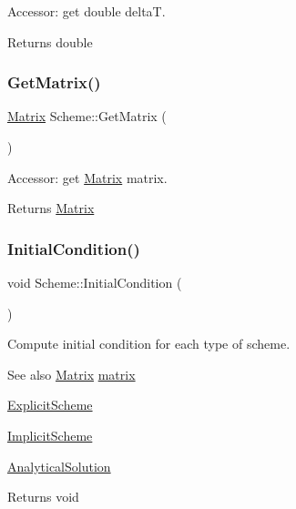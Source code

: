 Accessor\+: get double deltaT. \begin{DoxyReturn}{Returns}
double 
\end{DoxyReturn}
\mbox{\label{class_scheme_a14c333d182a6b4e94aa2a346000257ea}} 
\subsubsection{\texorpdfstring{Get\+Matrix()}{GetMatrix()}}
{\footnotesize\ttfamily \mbox{\hyperlink{class_matrix}{Matrix}} Scheme\+::\+Get\+Matrix (\begin{DoxyParamCaption}{ }\end{DoxyParamCaption})}

Accessor\+: get \mbox{\hyperlink{class_matrix}{Matrix}} matrix. \begin{DoxyReturn}{Returns}
\mbox{\hyperlink{class_matrix}{Matrix}} 
\end{DoxyReturn}
\mbox{\label{class_scheme_ad3546cda995629a2792629a072760ad2}} 
\subsubsection{\texorpdfstring{Initial\+Condition()}{InitialCondition()}}
{\footnotesize\ttfamily void Scheme\+::\+Initial\+Condition (\begin{DoxyParamCaption}{ }\end{DoxyParamCaption})\hspace{0.3cm}{\ttfamily [protected]}}

Compute initial condition for each type of scheme. \begin{DoxySeeAlso}{See also}
\mbox{\hyperlink{class_matrix}{Matrix}} \mbox{\hyperlink{class_scheme_a0e1fb8cb7e062d3f49715445a884f0e8}{matrix}} 

\mbox{\hyperlink{class_explicit_scheme}{Explicit\+Scheme}} 

\mbox{\hyperlink{class_implicit_scheme}{Implicit\+Scheme}} 

\mbox{\hyperlink{class_scheme_a7d3e9f8133a955517471eb7a6fea355f}{Analytical\+Solution}} 
\end{DoxySeeAlso}
\begin{DoxyReturn}{Returns}
void 
\end{DoxyReturn}
\mbox{\label{class_scheme_ac5803e4951dc125b274f543d5037c21d}} 
